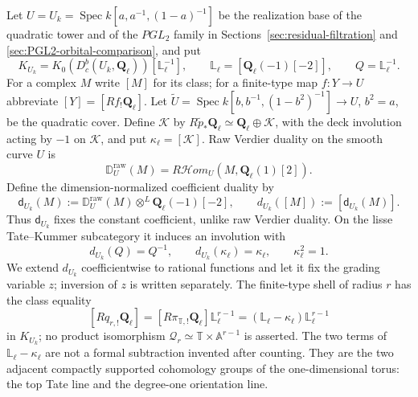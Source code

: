 \documentclass[11pt]{article}
\theoremstyle{definition}
\theoremstyle{remark}
\newcommand{\Qell}{\mathbf Q_\ell}
\newcommand{\Lell}{\mathbb L_{\ell}}
\newcommand{\Uk}{U_k}
\newcommand{\kappaell}{\kappa_{\ell}}
\newcommand{\cK}{\mathcal K}
\newcommand{\D}{\mathbb D}
\newcommand{\Spec}{\operatorname{Spec}}
\begin{document}
Let $U=\Uk=\Spec k[a,a^{-1},(1-a)^{-1}]$ be the realization base of the quadratic tower and
of the $PGL_2$ family in Sections~\ref{sec:residual-filtration} and
\ref{sec:PGL2-orbital-comparison}, and put
\[
 K_{\Uk}=K_0(D_c^b(\Uk,\Qell))[\Lell^{-1}],
 \qquad
 \Lell=[\Qell(-1)[-2]],\qquad Q=\Lell^{-1}.
\]
For a complex $M$ write $[M]$ for its class; for a finite-type map
$f:Y\to U$ abbreviate $[Y]=[Rf_!\Qell]$.  Let
$\widetilde U=\Spec k[b,b^{-1},(1-b^2)^{-1}]\to U$, $b^2=a$, be the
quadratic cover.
Define $\cK$ by
$R\widetilde p_*\Qell\simeq\Qell\oplus\cK$, with the deck involution acting
by $-1$ on $\cK$, and put $\kappaell=[\cK]$.  Raw Verdier duality on the smooth
curve $U$ is
\[
 \D_U^{\mathrm{raw}}(M)
 =R\mathcal Hom_U(M,\Qell(1)[2]).
\]
Define the dimension-normalized coefficient duality by
\begin{equation}
 \mathsf d_{\Uk}(M)
 :=\D_U^{\mathrm{raw}}(M)\otimes^L\Qell(-1)[-2],
 \qquad d_{\Uk}([M]):=[\mathsf d_{\Uk}(M)].
 \label{eq:normalized-U-duality}
\end{equation}
Thus $\mathsf d_{\Uk}$ fixes the constant coefficient, unlike raw Verdier
duality.  On the lisse Tate--Kummer subcategory it induces an involution with
\begin{equation}
 d_{\Uk}(Q)=Q^{-1},\qquad d_{\Uk}(\kappaell)=\kappaell,
 \qquad \kappaell^2=1.
 \label{eq:residual-coefficient-involution}
\end{equation}
We extend $d_{\Uk}$ coefficientwise to rational functions and let it fix the
grading variable $z$; inversion of $z$ is written separately.
The finite-type shell of radius $r$ has the class equality
\[
 [Rq_{r,!}\Qell]=[R\pi_{\mathbb T,!}\Qell]\Lell^{r-1}
 =(\Lell-\kappaell)\Lell^{r-1}
\]
in $K_{\Uk}$; no product isomorphism
$\mathscr Q_r\simeq\mathbb T\times\mathbb A^{r-1}$ is asserted.
The two terms of $\Lell-\kappaell$ are not a formal subtraction invented after
counting.  They are the two adjacent compactly supported cohomology groups of
the one-dimensional torus: the top Tate line and the degree-one orientation
line.
\end{document}

